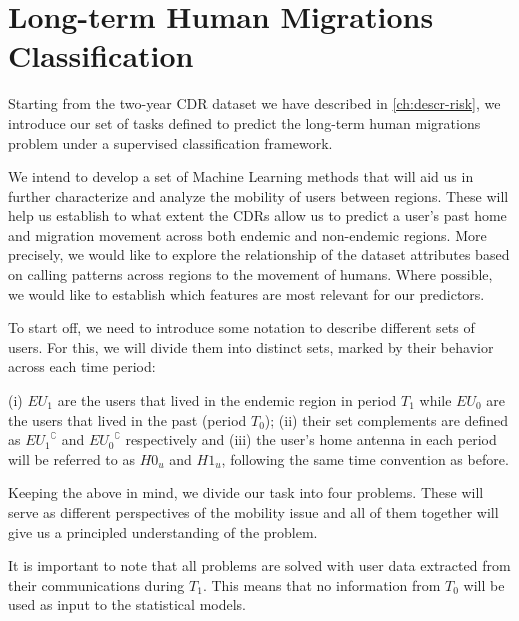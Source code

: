 \section{Long-term Human Migrations Classification}\label{long_term}

Starting from the two-year CDR dataset we have described in \cref{ch:descr-risk}, we introduce our set of tasks defined to predict the long-term human migrations problem under a supervised classification framework.

We intend to develop a set of Machine Learning methods that will aid us in further characterize and analyze the mobility of users between regions.
These will help us establish to what extent the CDRs allow us to predict a user's past home and migration movement across both endemic and non-endemic regions.
More precisely, we would like to explore the relationship of the dataset attributes based on calling patterns across regions to the movement of humans.
Where possible, we would like to establish which features are most relevant for our predictors.

To start off, we need to introduce some notation to describe different sets of users.
For this, we will divide them into distinct sets, marked by their behavior across each time period:

\begin{definition}\label{def:endemic_sets_periods}
	(i) $EU_{1}$ are the users that lived in the endemic region in period $T_1$ while $EU_{0}$ are the users that lived in the past (period $T_0$);
	(ii) their set complements are defined as ${ EU_1 }^{\complement}$ and ${ EU_0 }^{\complement}$ respectively and
	(iii) the user's home antenna in each period will be referred to as $H0_u$ and $H1_u$, following the same time convention as before.
\end{definition}



Keeping the above in mind, we divide our task into four problems.
These will serve as different perspectives of the mobility issue and all of them together will give us a principled understanding of the problem.

It is important to note that all problems are solved with user data extracted from their communications during $T_1$.
This means that no information from $T_0$ will be used as input to the statistical models.

